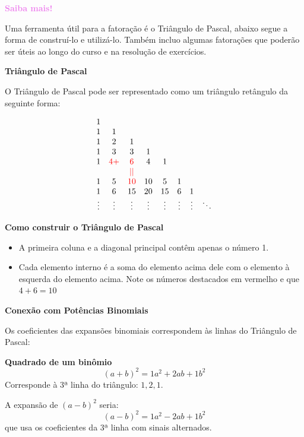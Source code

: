 \documentclass[12pt,openright,twoside,a4paper]{article}
\theoremstyle{definition}
\begin{document}
	\pagebreak 
	\begin{snugshade}
		\textbf{\textcolor{violet}{Saiba mais!}}
		
		Uma ferramenta útil para a fatoração é o Triângulo de Pascal, abaixo segue a forma de construí-lo e utilizá-lo. Também incluo algumas fatorações que poderão ser úteis ao longo do curso e na resolução de exercícios.
		
		\textbf{\large{Triângulo de Pascal}}
		
		O Triângulo de Pascal pode ser representado como um triângulo retângulo da seguinte forma:
		
		\[
		\begin{array}{cccccccc}
			1 &   &   &   &   &   &   & \\
			1 & 1 &   &   &   &   &   & \\
			1 & 2 & 1 &   &   &   &   & \\
			1 & 3 & 3 & 1 &   &   &   & \\
			1 & \textcolor{red}{4+} & \textcolor{red}{6} & 4 & 1 &   &   & \\
			 &   & $\textcolor{red}{||}$ &  &  &   &  &\\
			1 & 5 & \textcolor{red}{10} & 10 & 5 & 1 &   & \\
			1 & 6 & 15 & 20 & 15 & 6 & 1 & \\
			\vdots & \vdots & \vdots & \vdots & \vdots & \vdots & \vdots & \ddots \\
		\end{array}
		\]
		
		\textbf{Como construir o Triângulo de Pascal}
		
		\begin{itemize}
			\item A primeira coluna e a diagonal principal contêm apenas o número 1.
			\item Cada elemento interno é a soma do elemento acima dele com o elemento à esquerda do elemento acima. Note os números destacados em vermelho e que $4 + 6 = 10$
		\end{itemize}
		
		\textbf{\large{Conexão com Potências Binomiais}}
		
		Os coeficientes das expansões binomiais correspondem às linhas do Triângulo de Pascal:
		
		\textbf{Quadrado de um binômio}
		\[ (a + b)^2 = \boxed{1}a^2 + \boxed{2}ab + \boxed{1}b^2 \]
		Corresponde à $3$ª linha do triângulo: $1, 2, 1$.
		
		A expansão de $(a - b)^2$ seria:
		\[ (a - b)^2 = 1a^2 - 2ab + 1b^2 \]
		que usa os coeficientes da 3ª linha com sinais alternados.
		

\end{snugshade}
\end{document}
